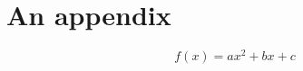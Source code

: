 \cleardoublepage
\appendix
\chapter{An appendix}
\begin{equation}
  f(x) = ax^2 + bx + c
\end{equation}